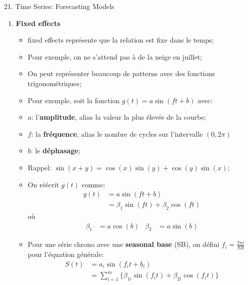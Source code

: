 \documentclass[12pt, titlepage, french]{report}
\begin{document}
\begin{CHPT_SUMM}[label = {timeseries21}]{21. Time Series: Forecasting Models}
\begin{enumerate}
\begin{itemize}
		\texttt{[image: src/sine-wave-autocorrelation.png]}
		\item[]	Il y a de l'auto-corrélation cyclique;
		\item[] La 1ère valeur est très semblable à la 24ème, la 12ème à la 36ème, etc. et donc nous allons observer des valeurs très semblables à chaque 24 unité de temps;
		\item[]	De plus, le graphique \textbf{ressemble} évidemment \textbf{à une fonction sinusoïdale};
		\item 	Alors, nous avons un cycle \textbf{saisonnale} pouvant être \textbf{estimé par une fonction sinusoïdale};
		\end{itemize}
	\item[]	\textbf{Fixed effects}
		\begin{itemize}
		\item	\og fixed effects \fg{} représente que la relation est fixe dans le temps;
		\item[]	Pour exemple, on ne s'attend pas à de la neige en juillet;
		\item	On peut représenter beaucoup de patterns avec des fonctions trigonométriques;
		\item	Pour exemple, soit la fonction $g(t) = a \sin (f t + b)$ avec:
		\item[]	$a$: l'\textbf{amplitude}, alias la valeur la plus élevée de la courbe;
		\item[]	$f$: la \textbf{fréquence}, alias le nombre de cycles sur l'intervalle $(0, 2\pi)$
		\item[]	$b$: le \textbf{déphasage};
		\item	Rappel: $\sin(x + y) = \cos(x) \sin(y) + \cos(y) \sin(x)$;
		\item	On réécrit $g(t)$ comme:
		\begin{align*}
			g(t)
				&=	a \sin (f t + b)	\\
				&=	\beta_{1} \sin(ft) + \beta_{2} \cos(ft)	
		\end{align*}
		où
		\begin{align*}
			\beta_{1}	
				&=	a \cos (b)	&
			\beta_{2}	
				&=	a \sin (b)	
		\end{align*}
		\item	Pour une série chrono avec une \textbf{seasonal base} (SB), on défini $f_{i} = \frac{2\pi i}{SB}$ pour l'équation générale:
		\begin{align*}
			S(t)
				&=	a_{i	} \sin (f_{i} t + b_{i})	\\
				&=	\sum_{i = 1}^{m} \{ \beta_{1i} \sin(f_{i}t) + \beta_{2i} \cos(f_{i}t)	 \} 

\end{align*}
\end{itemize}
\end{enumerate}
\end{CHPT_SUMM}
\end{document}
